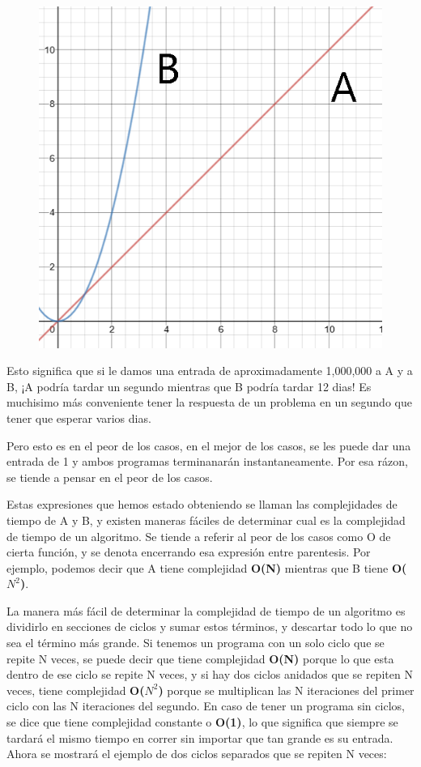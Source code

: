 \documentclass{article}
\begin{document}
\begin{figure}[H]
    \centering
    \includegraphics[width=0.3\paperwidth]{nsquared}
\end{figure}

Esto significa que si le damos una entrada de aproximadamente 1,000,000 a A y a B, ¡A podría tardar un segundo mientras que B podría tardar 12 dias! Es muchisimo más conveniente tener la respuesta de un problema en un segundo que tener que esperar varios dias.

Pero esto es en el peor de los casos, en el mejor de los casos, se les puede dar una entrada de 1 y ambos programas terminanarán instantaneamente. Por esa rázon, se tiende a pensar en el peor de los casos.

Estas expresiones que hemos estado obteniendo se llaman las complejidades de tiempo de A y B, y existen maneras fáciles de determinar cual es la complejidad de tiempo de un algoritmo. Se tiende a referir al peor de los casos como O de cierta función, y se denota encerrando esa expresión entre parentesis. Por ejemplo, podemos decir que A tiene complejidad \textbf{O(N)} mientras que B tiene \textbf{O($N^2$)}.

La manera más fácil de determinar la complejidad de tiempo de un algoritmo es dividirlo en secciones de ciclos y sumar estos términos, y descartar todo lo que no sea el término más grande. Si tenemos un programa con un solo ciclo que se repite N veces, se puede decir que tiene complejidad \textbf{O(N)} porque lo que esta dentro de ese ciclo se repite N veces, y si hay dos ciclos anidados que se repiten N veces, tiene complejidad \textbf{O($N^2$)} porque se multiplican las N iteraciones del primer ciclo con las N iteraciones del segundo. En caso de tener un programa sin ciclos, se dice que tiene complejidad constante o \textbf{O(1)}, lo que significa que siempre se tardará el mismo tiempo en correr sin importar que tan grande es su entrada. Ahora se mostrará el ejemplo de dos ciclos separados que se repiten N veces:
\end{document}
